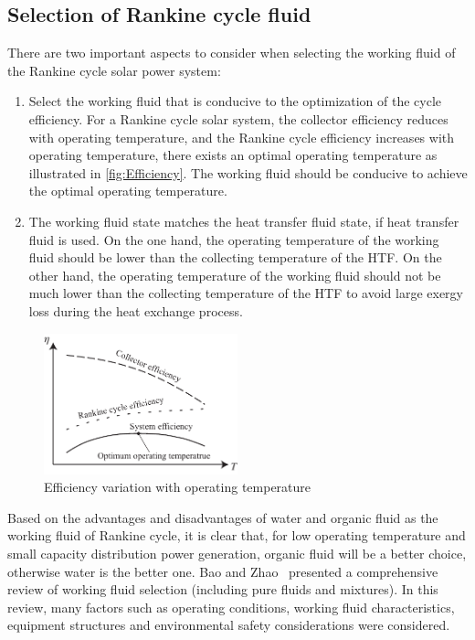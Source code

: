 \subsection{Selection of Rankine cycle fluid}

There are two important aspects to consider when selecting the working fluid of the Rankine cycle solar power system:
\begin{enumerate}
  \item Select the working fluid that is conducive to the optimization of the cycle efficiency.  
  For a Rankine cycle solar system, the collector efficiency reduces with operating temperature, and the Rankine cycle efficiency increases with operating temperature, there exists an optimal operating temperature as illustrated in \autoref{fig:Efficiency}. The working fluid should be conducive to achieve the optimal operating temperature.
  
  \item The working fluid state matches the heat transfer fluid state, if heat transfer fluid is used.
    On the one hand, the operating temperature of the working fluid should be lower than the collecting temperature of the HTF. On the other hand, the operating temperature of the working fluid should not be much lower than the collecting temperature of the HTF to avoid large exergy loss during the heat exchange process.
\end{enumerate}
\begin{figure}[!ht]
\centering 
\includegraphics[width=0.5\textwidth]{fig/Efficiency}
\caption{Efficiency variation with operating temperature}\label{fig:Efficiency}
\end{figure}

Based on the advantages and disadvantages of water and organic fluid as the working fluid of Rankine cycle, it is clear that, for low operating temperature and small capacity distribution power generation, organic fluid will be a better choice, otherwise water is the better one. Bao and Zhao~\cite{Bao2013} presented a comprehensive review of working fluid selection (including pure fluids and mixtures). In this review, many factors such as operating conditions, working fluid characteristics, equipment structures and environmental safety considerations were considered.

